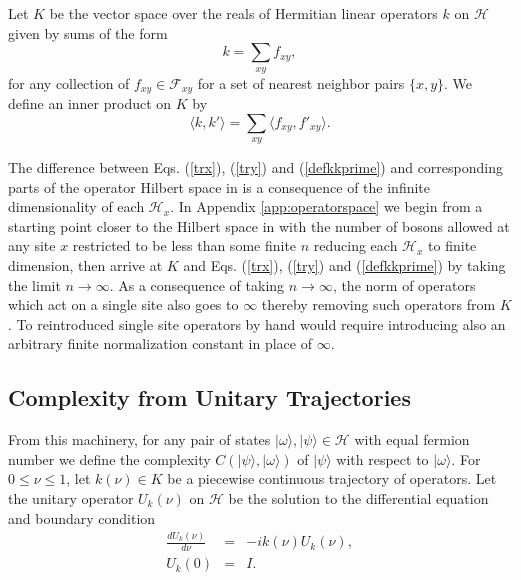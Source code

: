 \documentclass[twocolumn,amsmath,amssymb]{revtex4-1}
\begin{document}
Let $K$ be the vector space over the reals of Hermitian linear
operators $k$ on $\mathcal{H}$
given by sums of the form
\begin{equation}
\label{defk}
k = \sum_{x y} f_{x y},
\end{equation}
for any collection of 
$f_{x y} \in \mathcal{F}_{x y}$ for a set of nearest neighbor pairs $\{x, y\}$.
We define an inner product on $K$
by
\begin{equation}
\label{defkkprime}
 \langle  k, k' \rangle   =  \sum_{xy}  \langle  f_{xy}, f'_{xy} \rangle .
\end{equation}

The difference between Eqs. (\ref{trx}), (\ref{try}) and (\ref{defkkprime})
and corresponding parts of the operator Hilbert space in \cite{Nielsen}
is a consequence of the infinite dimensionality of each $\mathcal{H}_x$.
In Appendix \ref{app:operatorspace} we begin from
a starting point closer to the Hilbert space in \cite{Nielsen}
with the number of bosons allowed at any site $x$
restricted to be less than some finite $n$ reducing each $\mathcal{H}_x$ to
finite dimension, then arrive at $K$
and  Eqs. (\ref{trx}), (\ref{try}) and (\ref{defkkprime})
by taking the limit $n \rightarrow \infty$.
As a consequence of taking $n \rightarrow \infty$,
the norm of operators which act on a single site
also goes to $\infty$ thereby removing such 
operators from $K$.
To reintroduced single site operators by hand
would require
introducing also an
arbitrary finite normalization constant
in place of $\infty$.




\subsection{\label{subsec:complexitydef} Complexity from Unitary Trajectories}

From this machinery, for any pair of states $| \omega \rangle , |\psi \rangle  \in \mathcal{H}$ with equal
fermion number we define 
the complexity $C(|\psi \rangle , |\omega \rangle )$ of $|\psi \rangle $ with
respect to $|\omega \rangle $. 
For $0 \leq \nu \leq 1$, let $k( \nu) \in K$ be a piecewise continuous trajectory of operators.
Let the unitary operator $U_k(\nu)$ on $\mathcal{H}$ be the solution to the differential
equation and boundary condition
\begin{subequations}
\begin{eqnarray}
\label{udot}
\frac{dU_k(\nu)}{d \nu} & = &-i k( \nu) U_k( \nu), \\
\label{uboundary0}
U_k( 0) & = & I.
\end{eqnarray}
\end{subequations}
\end{document}
